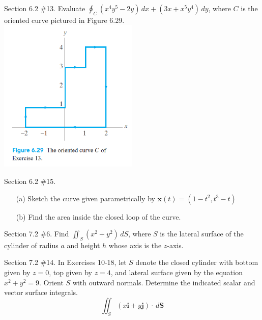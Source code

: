 \documentclass[12pt,letterpaper]{hmcpset}
\begin{document}
\newpage

\begin{problem}
Section 6.2 \#13. Evaluate $\oint_C (x^4 y^5 - 2y) \,dx + (3x + x^5 y^4) \,dy$, where $C$ is the oriented curve pictured in Figure 6.29.\\
\includegraphics[width=0.5\textwidth]{figure6-29.png}
\end{problem}

\newpage

\begin{problem}
Section 6.2 \#15.
\begin{enumerate}
	\item[(a)] Sketch the curve given parametrically by $\mathbf{x}(t) = (1 - t^2, t^3 - t)$
	\item[(b)] Find the area inside the closed loop of the curve.
\end{enumerate}
\end{problem}

\newpage

\begin{problem}
Section 7.2 \#6. Find $ \iint_S (x^2 + y^2) \,dS $, where $S$ is the lateral surface of the cylinder of radius $a$ and height $h$ whose axis is the $z$-axis.
\end{problem}

\newpage

\begin{problem}
Section 7.2 \#14. In Exercises 10-18, let $S$ denote the closed cylinder with bottom given by $z = 0$, top given by $z = 4$, and lateral surface given by the equation $x^2 + y^2 = 9$. Orient $S$ with outward normals. Determine the indicated scalar and vector surface integrals.
$$ \iint_S (x \mathbf{i} + y \mathbf{j}) \cdot \,d \mathbf{S}$$
\end{problem}
\end{document}
